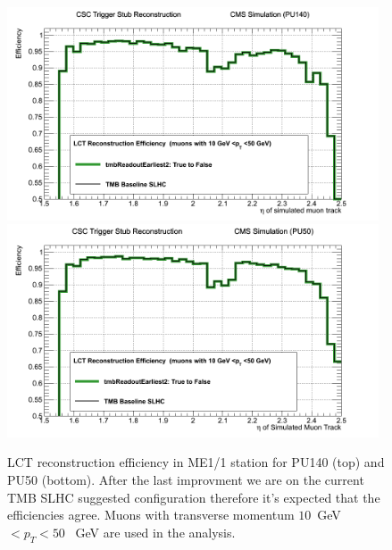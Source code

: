 \begin{figure}[h!]
\includegraphics[width=0.98\textwidth]{figures/PU140_Improv_from9_to_10.png}
\includegraphics[width=0.98\textwidth]{figures/PU50_Improv_from9_to_10.png}
\caption{LCT reconstruction efficiency in ME1/1 station for PU140 (top) and PU50 (bottom). After the last improvment we are on the current TMB SLHC suggested configuration therefore it's expected that the efficiencies agree. Muons with transverse momentum $10$~GeV$<p_T<50$~ GeV are used in the analysis.}
\label{fig:From9to10}
\end{figure}